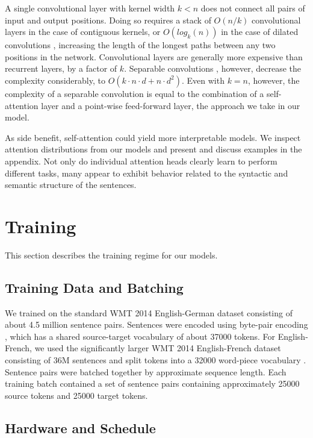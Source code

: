 \documentclass{article}
\begin{document}
A single convolutional layer with kernel width $k < n$ does not connect all pairs of input and output positions. Doing so requires a stack of $O(n/k)$ convolutional layers in the case of contiguous kernels, or $O(log_k(n))$ in the case of dilated convolutions \citep{NalBytenet2017}, increasing the length of the longest paths between any two positions in the network.
Convolutional layers are generally more expensive than recurrent layers, by a factor of $k$. Separable convolutions \citep{xception2016}, however, decrease the complexity considerably, to $O(k \cdot n \cdot d + n \cdot d^2)$. Even with $k=n$, however, the complexity of a separable convolution is equal to the combination of a self-attention layer and a point-wise feed-forward layer, the approach we take in our model.







As side benefit, self-attention could yield more interpretable models. We inspect attention distributions from our models and present and discuss examples in the appendix. Not only do individual attention heads clearly learn to perform different tasks, many appear to exhibit behavior related to the syntactic and semantic structure of the sentences.

 
\section{Training}
This section describes the training regime for our models. 



\subsection{Training Data and Batching}
We trained on the standard WMT 2014 English-German dataset consisting of about 4.5 million sentence pairs.  Sentences were encoded using byte-pair encoding \citep{DBLP:journals/corr/BritzGLL17}, which has a shared source-target vocabulary of about 37000 tokens. For English-French, we used the significantly larger WMT 2014 English-French dataset consisting of 36M sentences and split tokens into a 32000 word-piece vocabulary \citep{wu2016google}.  Sentence pairs were batched together by approximate sequence length.  Each training batch contained a set of sentence pairs containing approximately 25000 source tokens and 25000 target tokens.  

\subsection{Hardware and Schedule}
\end{document}
